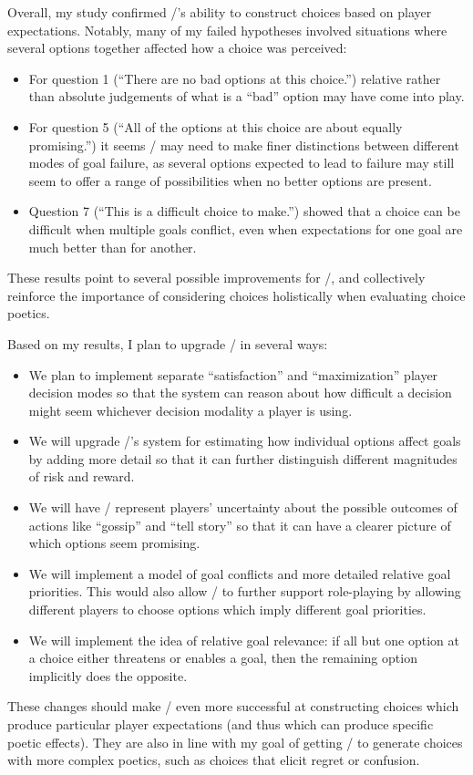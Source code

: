 Overall, my study confirmed \dunyazad/'s ability to construct choices based on player expectations.
%
Notably, many of my failed hypotheses involved situations where several options together affected how a choice was perceived:
%
\begin{itemize}
  \item For question 1 (``There are no bad options at this choice.'') relative rather than absolute judgements of what is a ``bad'' option may have come into play.
  \item For question 5 (``All of the options at this choice are about equally promising.'') it seems \dunyazad/ may need to make finer distinctions between different modes of goal failure, as several options expected to lead to failure may still seem to offer a range of possibilities when no better options are present.
  \item Question 7 (``This is a difficult choice to make.'') showed that a choice can be difficult when multiple goals conflict, even when expectations for one goal are much better than for another.
\end{itemize}
%
These results point to several possible improvements for \dunyazad/, and collectively reinforce the importance of considering choices holistically when evaluating choice poetics.


Based on my results, I plan to upgrade \dunyazad/ in several ways:
%
\begin{itemize}
  \item We plan to implement separate ``satisfaction'' and ``maximization'' player decision modes so that the system can reason about how difficult a decision might seem whichever decision modality a player is using.
  \item We will upgrade \dunyazad/'s system for estimating how individual options affect goals by adding more detail so that it can further distinguish different magnitudes of risk and reward.
  \item We will have \dunyazad/ represent players' uncertainty about the possible outcomes of actions like ``gossip'' and ``tell story'' so that it can have a clearer picture of which options seem promising.
  \item We will implement a model of goal conflicts and more detailed relative goal priorities. This would also allow \dunyazad/ to further support role-playing by allowing different players to choose options which imply different goal priorities.
  \item We will implement the idea of relative goal relevance: if all but one option at a choice either threatens or enables a goal, then the remaining option implicitly does the opposite.
\end{itemize}
%
These changes should make \dunyazad/ even more successful at constructing choices which produce particular player expectations (and thus which can produce specific poetic effects).
%
They are also in line with my goal of getting \dunyazad/ to generate choices with more complex poetics, such as choices that elicit regret or confusion.


